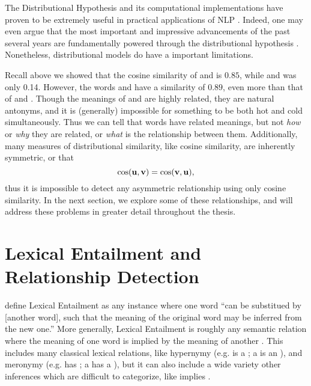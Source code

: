 The Distributional Hypothesis and its computational implementations have proven
to be extremely useful in practical applications of NLP \cite{cho:2015:arxiv,goldberg:2016:jair}. Indeed,
one may even argue that the most important and impressive advancements of
the past several years are fundamentally powered through the distributional
hypothesis \cite{manning:2015:cl}. Nonetheless, distributional models do have
a important limitations.

Recall above we showed that the cosine similarity of  and
 is $0.85$, while  and  was only 0.14.
However,  the words  and  have a similarity of $0.89$, even
more than that of  and . Though the meanings of
 and  are highly related, they are natural antonyms, and it
is (generally) impossible for something to be both hot and cold simultaneously.
Thus we can tell that words have related meanings, but not {\em how} or {\em
why} they are related, or {\em what} is the relationship between them.
Additionally, many measures of distributional similarity, like cosine similarity,
are inherently symmetric, or that
\begin{equation*}
  \text{cos}({\mathbf{u}}, {\mathbf{v}}) = \text{cos}({\mathbf{v}}, {\mathbf{u}}),
\end{equation*}
thus it is impossible to detect any asymmetric relationship using only cosine
similarity. In the next section, we explore some of these relationships, and
will address these problems in greater detail throughout the thesis.

\section{Lexical Entailment and Relationship Detection}

 define Lexical Entailment as any instance
where one word ``can be substitued by [another word], such that the meaning of
the original word may be inferred from the new one.'' More generally,
Lexical Entailment is roughly any semantic relation where
the meaning of one word is implied by the meaning of another
\cite{shnarch:2008:thesis}.
This includes many classical lexical relations, like hypernymy
(e.g.  is a ; a  is an ), and meronymy
(e.g.  has ; a  has a ), but it can also include a
wide variety other inferences which are difficult to categorize,
like  implies . 

